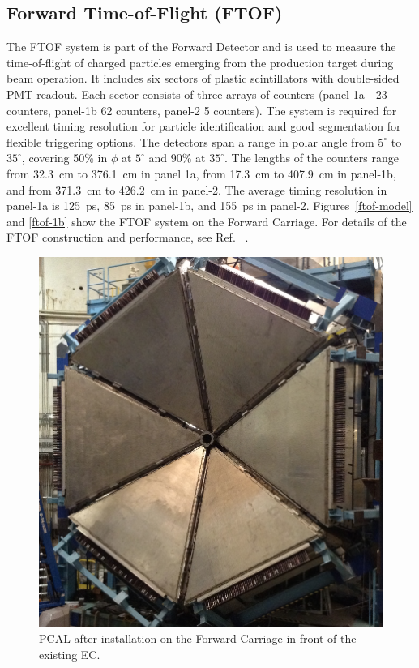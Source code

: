 \documentclass[final,3p,twocolumn]{elsarticle}
\begin{document}
\subsection{Forward Time-of-Flight (FTOF)}
\label{ftof}

The FTOF system is part of the Forward Detector and is used to measure the time-of-flight of charged particles 
emerging from the production target during beam operation. It includes six sectors of plastic scintillators with 
double-sided PMT readout. Each sector consists of three arrays of counters (panel-1a - 23 counters, panel-1b 62
counters, panel-2 5 counters). The system is required for excellent timing resolution for particle identification and
good segmentation for flexible triggering options. The detectors span a range in polar angle from $5^\circ$ to
$35^\circ$, covering 50\% in $\phi$ at $5^\circ$ and 90\% at $35^\circ$. The lengths of the counters range from
32.3~cm to 376.1~cm in panel 1a, from 17.3~cm to 407.9~cm in panel-1b, and from 371.3~cm to 426.2~cm in panel-2.
The average timing resolution in panel-1a is 125~ps, 85~ps in panel-1b, and 155~ps in panel-2. Figures~\ref{ftof-model}
and \ref{ftof-1b} show the FTOF system on the Forward Carriage. For details of the FTOF construction and
performance, see Ref. ~\cite{FTOF}. 

\begin{figure}[htbp!]
\centerline{\includegraphics[width=0.95\columnwidth]{PCAL.png}}
\caption{PCAL after installation on the Forward Carriage in front of the existing EC. }
\label{ec-pcal}
\end{figure}
\end{document}
